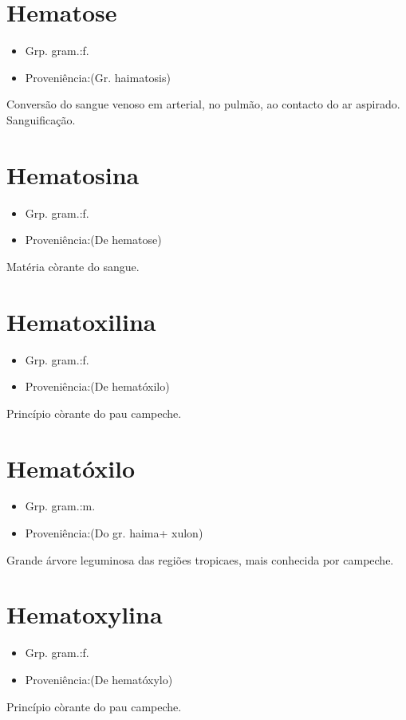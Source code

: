 \documentclass{article}
\begin{document}
\section{Hematose}
\begin{itemize}
\item {Grp. gram.:f.}
\end{itemize}
\begin{itemize}
\item {Proveniência:(Gr. \textunderscore haimatosis\textunderscore )}
\end{itemize}
Conversão do sangue venoso em arterial, no pulmão, ao contacto do ar aspirado.
Sanguificação.
\section{Hematosina}
\begin{itemize}
\item {Grp. gram.:f.}
\end{itemize}
\begin{itemize}
\item {Proveniência:(De \textunderscore hematose\textunderscore )}
\end{itemize}
Matéria còrante do sangue.
\section{Hematoxilina}
\begin{itemize}
\item {Grp. gram.:f.}
\end{itemize}
\begin{itemize}
\item {Proveniência:(De \textunderscore hematóxilo\textunderscore )}
\end{itemize}
Princípio còrante do pau campeche.
\section{Hematóxilo}
\begin{itemize}
\item {Grp. gram.:m.}
\end{itemize}
\begin{itemize}
\item {Proveniência:(Do gr. \textunderscore haima\textunderscore  + \textunderscore xulon\textunderscore )}
\end{itemize}
Grande árvore leguminosa das regiões tropicaes, mais conhecida por \textunderscore campeche\textunderscore .
\section{Hematoxylina}
\begin{itemize}
\item {Grp. gram.:f.}
\end{itemize}
\begin{itemize}
\item {Proveniência:(De \textunderscore hematóxylo\textunderscore )}
\end{itemize}
Princípio còrante do pau campeche.
\end{document}
